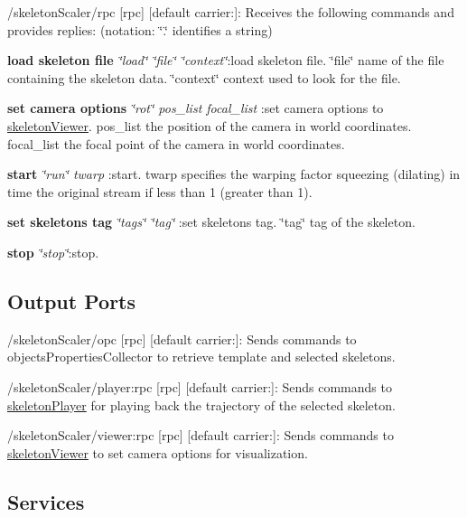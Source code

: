 \begin{DoxyItemize}
\item /skeleton\+Scaler/rpc \mbox{[}rpc\mbox{]} \mbox{[}default carrier\+:\mbox{]}\+: Receives the following commands and provides replies\+: (notation\+: \char`\"{}.\char`\"{} identifies a string)
\begin{DoxyEnumerate}
\item {\bfseries{load skeleton file}} {\itshape \char`\"{}load\char`\"{} \char`\"{}file\char`\"{} \char`\"{}context\char`\"{}}\+:load skeleton file. \char`\"{}file\char`\"{} name of the file containing the skeleton data. \char`\"{}context\char`\"{} context used to look for the file.
\item {\bfseries{set camera options}} {\itshape \char`\"{}rot\char`\"{} pos\+\_\+list focal\+\_\+list }\+:set camera options to \mbox{\hyperlink{group__skeletonViewer}{skeleton\+Viewer}}. pos\+\_\+list the position of the camera in world coordinates. focal\+\_\+list the focal point of the camera in world coordinates.
\item {\bfseries{start}} {\itshape \char`\"{}run\char`\"{} twarp }\+:start. twarp specifies the warping factor squeezing (dilating) in time the original stream if less than 1 (greater than 1).
\item {\bfseries{set skeleton\textquotesingle{}s tag}} {\itshape \char`\"{}tags\char`\"{} \char`\"{}tag\char`\"{} }\+:set skeleton\textquotesingle{}s tag. \char`\"{}tag\char`\"{} tag of the skeleton.
\item {\bfseries{stop}} {\itshape \char`\"{}stop\char`\"{}}\+:stop.
\end{DoxyEnumerate}
\end{DoxyItemize}\hypertarget{group__skeletonViewer_outputports_sec}{}\subsection{Output Ports}\label{group__skeletonViewer_outputports_sec}

\begin{DoxyItemize}
\item /skeleton\+Scaler/opc \mbox{[}rpc\mbox{]} \mbox{[}default carrier\+:\mbox{]}\+: Sends commands to objects\+Properties\+Collector to retrieve template and selected skeletons.
\item /skeleton\+Scaler/player\+:rpc \mbox{[}rpc\mbox{]} \mbox{[}default carrier\+:\mbox{]}\+: Sends commands to \mbox{\hyperlink{group__skeletonPlayer}{skeleton\+Player}} for playing back the trajectory of the selected skeleton.
\item /skeleton\+Scaler/viewer\+:rpc \mbox{[}rpc\mbox{]} \mbox{[}default carrier\+:\mbox{]}\+: Sends commands to \mbox{\hyperlink{group__skeletonViewer}{skeleton\+Viewer}} to set camera options for visualization.
\end{DoxyItemize}\hypertarget{group__skeletonViewer_services_sec}{}\subsection{Services}\label{group__skeletonViewer_services_sec}
